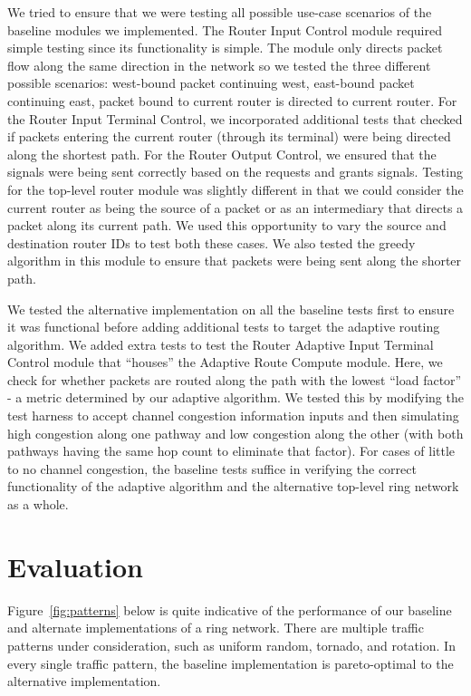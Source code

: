 \documentclass[10pt]{article}
\begin{document}
We tried to ensure that we were testing all possible use-case scenarios of the baseline
modules we implemented. The Router Input Control module required simple testing since its
functionality is simple. The module only directs packet flow along the same 
direction in the network so we tested the three different possible scenarios: west-bound packet
continuing west, east-bound packet continuing east, packet bound to current router is 
directed to current router. For the Router Input Terminal Control, we incorporated 
additional tests that checked if packets entering the current router (through its 
terminal) were being directed along the shortest path. For the Router Output Control, 
we ensured that the  signals were being sent correctly based on the 
requests and grants signals. Testing for the top-level router module was slightly different
in that we could consider the current router as being the source of a packet or as an
intermediary that directs a packet along its current path. We used this opportunity to vary
the source and destination router IDs to test both these cases. We also tested the greedy
algorithm in this module to ensure that packets were being sent along the shorter path. \par

We tested the alternative implementation on all the baseline tests first to ensure it was
functional before adding additional tests to target the adaptive routing algorithm. We
added extra tests to test the Router Adaptive Input Terminal Control module that ``houses''
the Adaptive Route Compute module. Here, we check for whether packets are routed along the
path with the lowest ``load factor'' - a metric determined by our adaptive algorithm. We 
tested this by modifying the test harness to accept channel congestion information inputs and 
then simulating high congestion along one pathway and low congestion along the other (with 
both pathways having the same hop count to eliminate that factor). For cases of little to no 
channel congestion, the baseline tests suffice in verifying the correct functionality of the 
adaptive algorithm and the alternative top-level ring network as a whole.

\section{Evaluation}

Figure~\ref{fig:patterns} below is quite indicative of the performance of
our baseline and alternate implementations of a ring network.
There are multiple traffic patterns under consideration, such as uniform 
random, tornado, and rotation. 
In every single traffic pattern, the baseline implementation is pareto-optimal
to the alternative implementation. \par
\end{document}
